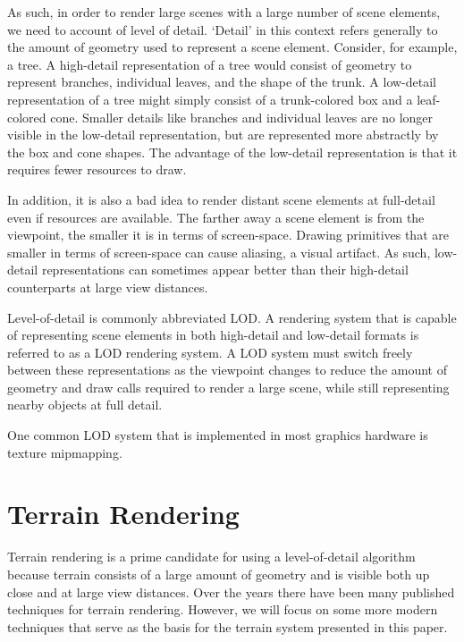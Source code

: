 As such, in order to render large scenes with a large number of scene elements, we need to account of level of detail.
`Detail' in this context refers generally to the amount of geometry used to represent a scene element.
Consider, for example, a tree.
A high-detail representation of a tree would consist of geometry to represent branches, individual leaves, and the shape of the trunk.
A low-detail representation of a tree might simply consist of a trunk-colored box and a leaf-colored cone.
Smaller details like branches and individual leaves are no longer visible in the low-detail representation, but are represented more abstractly by the box and cone shapes.
The advantage of the low-detail representation is that it requires fewer resources to draw.

In addition, it is also a bad idea to render distant scene elements at full-detail even if resources are available.
The farther away a scene element is from the viewpoint, the smaller it is in terms of screen-space.
Drawing primitives that are smaller in terms of screen-space can cause aliasing, a visual artifact.
As such, low-detail representations can sometimes appear better than their high-detail counterparts at large view distances.

Level-of-detail is commonly abbreviated LOD.
A rendering system that is capable of representing scene elements in both high-detail and low-detail formats is referred to as a LOD rendering system.
A LOD system must switch freely between these representations as the viewpoint changes to reduce the amount of geometry and draw calls required to render a large scene, while still representing nearby objects at full detail.

One common LOD system that is implemented in most graphics hardware is texture mipmapping. \cite{opengl_mipmaps}


\section{Terrain Rendering}

Terrain rendering is a prime candidate for using a level-of-detail algorithm because terrain consists of a large amount of geometry and is visible both up close and at large view distances.
Over the years there have been many published techniques for terrain rendering.
\cite{p-bdam}
\cite{hardware_lod}
\cite{diamondterrain}
\cite{roambetter}
\cite{clod}
\cite{roam}
\cite{righttri}
\cite{bruneton_terrain}
However, we will focus on some more modern techniques that serve as the basis for the terrain system presented in this paper.


